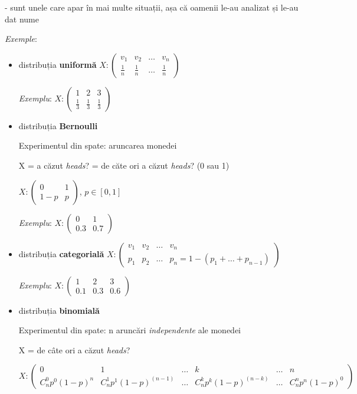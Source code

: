 \documentclass[12pt]{article}
\begin{document}
	- sunt unele care apar în mai multe situații, așa că oamenii le-au analizat și le-au dat nume

	\textit{Exemple}:
	
	\begin{itemize}
		\item distribuția \textbf{uniformă}
		$X : \begin{pmatrix}
		v_1 & v_2 &\dots & v_n\\
		\frac{1}{n} & \frac{1}{n} & \dots & \frac{1}{n}
		\end{pmatrix}$
		
		\textit{Exemplu}: $X : \begin{pmatrix}
		1 & 2&3\\
		\frac{1}{3} & \frac{1}{3} &\frac{1}{3}
		\end{pmatrix}$
		\item distribuția \textbf{Bernoulli}
		
		Experimentul din spate: aruncarea monedei
		
		X = a căzut \textit{heads}? = de căte ori a căzut \textit{heads}? (0 sau 1)
		
		$X:\begin{pmatrix}
		0&1\\
		1-p&p
		\end{pmatrix}$, $p \in [0,1]$
		
		\textit{Exemplu}: $X : \begin{pmatrix}
		0 & 1\\
		0.3 & 0.7
		\end{pmatrix}$
		\item distribuția \textbf{categorială}
		$X : \begin{pmatrix}
		v_1 & v_2 &\dots & v_n\\
		p_1 & p_2 & \dots & p_n = 1-(p_1+\dots+p_{n-1})
		\end{pmatrix}$
		
		\textit{Exemplu}: $X : \begin{pmatrix}
		1 & 2 &3\\
		0.1 & 0.3& 0.6
		\end{pmatrix}$
		
		\item distribuția \textbf{binomială}
		
		Experimentul din spate: n aruncări \textit{independente} ale monedei
		
		X = de câte ori a căzut \textit{heads}?
		
		$X : \begin{pmatrix}
		0 & 1 &\dots&k&\dots&n\\
		C_n^0p^0(1-p)^n & C_n^1p^1(1-p)^{(n-1)}&\dots&C_n^kp^k(1-p)^{(n-k)}&\dots&C_n^np^n(1-p)^0
		\end{pmatrix}$
		

\end{itemize}
\end{document}
